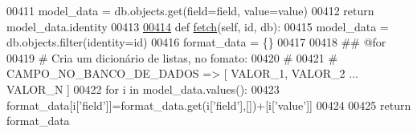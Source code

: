 \begin{DoxyCode}
00411         model\_data = db.objects.get(field=field, value=value)
00412         \textcolor{keywordflow}{return} model\_data.identity
00413 
\hypertarget{CourseUnit_8py_source_l00414}{}\hyperlink{classCourse_1_1CourseUnit_1_1PersCourse_ad80c75d03ace40dd77b2e7a8b9964dd9}{00414}     \textcolor{keyword}{def }\hyperlink{classCourse_1_1CourseUnit_1_1PersCourse_ad80c75d03ace40dd77b2e7a8b9964dd9}{fetch}(self, id, db):
00415         model\_data = db.objects.filter(identity=id)
00416         format\_data = \{\}
00417 
00418         \textcolor{comment}{## @for}
00419         \textcolor{comment}{#   Cria um dicionário de listas, no fomato:}
00420         \textcolor{comment}{#}
00421         \textcolor{comment}{#   CAMPO\_NO\_BANCO\_DE\_DADOS => [ VALOR\_1, VALOR\_2 ... VALOR\_N ]}
00422         \textcolor{keywordflow}{for} i \textcolor{keywordflow}{in} model\_data.values():
00423             format\_data[i[\textcolor{stringliteral}{'field'}]]=format\_data.get(i[\textcolor{stringliteral}{'field'}],[])+[i[\textcolor{stringliteral}{'value'}]]
00424 
00425         \textcolor{keywordflow}{return} format\_data
\end{DoxyCode}
